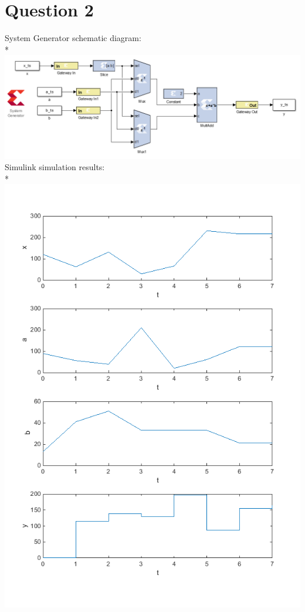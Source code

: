 \documentclass[11pt]{article}
\begin{document}
\section*{Question 2}
System Generator schematic diagram:\\*
\includegraphics[width=\linewidth]{q2/model.png}\\
\clearpage
Simulink simulation results:\\*
\includegraphics[width=\linewidth]{q2/data_plot.png}
\end{document}
